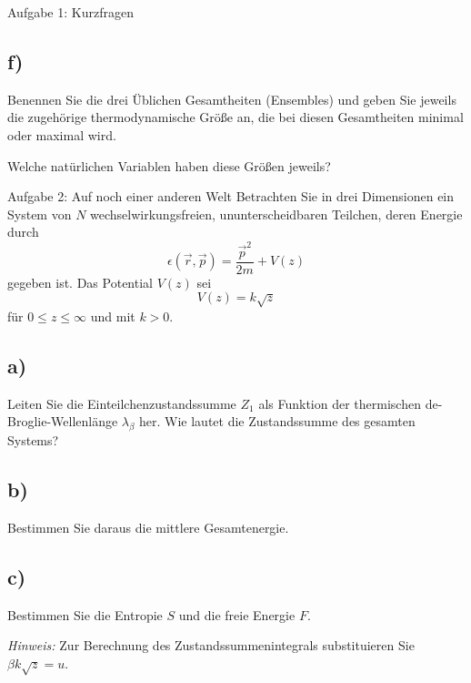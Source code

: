 \begin{aufgabe}{Aufgabe 1: Kurzfragen}
    \subsection{f)}
    Benennen Sie die drei Üblichen Gesamtheiten (Ensembles) und geben Sie jeweils die zugehörige thermodynamische Größe an,
    die bei diesen Gesamtheiten minimal oder maximal wird.

    Welche natürlichen Variablen haben diese Größen jeweils?
\end{aufgabe}

\begin{aufgabe}{Aufgabe 2: Auf noch einer anderen Welt}
    Betrachten Sie in drei Dimensionen ein System von $N$ wechselwirkungsfreien, ununterscheidbaren Teilchen, deren Energie durch
    \[
        \epsilon(\vec r, \vec p) = \frac{\vec p^2}{2m} + V(z)
    \]
    gegeben ist.
    Das Potential $V(z)$ sei
    \[
        V(z) = k\sqrt{z}
    \]
    für $0 \leq z \leq \infty$ und mit $k > 0$.

    \subsection{a)}
    Leiten Sie die Einteilchenzustandssumme $Z_1$ als Funktion der thermischen de-Broglie-Wellenlänge $\lambda_\beta$ her.
    Wie lautet die Zustandssumme des gesamten Systems?

    \subsection{b)}
    Bestimmen Sie daraus die mittlere Gesamtenergie.

    \subsection{c)}
    Bestimmen Sie die Entropie $S$ und die freie Energie $F$.

    \textit{Hinweis:} Zur Berechnung des Zustandssummenintegrals substituieren Sie $\beta k \sqrt{z} = u$.
\end{aufgabe}

